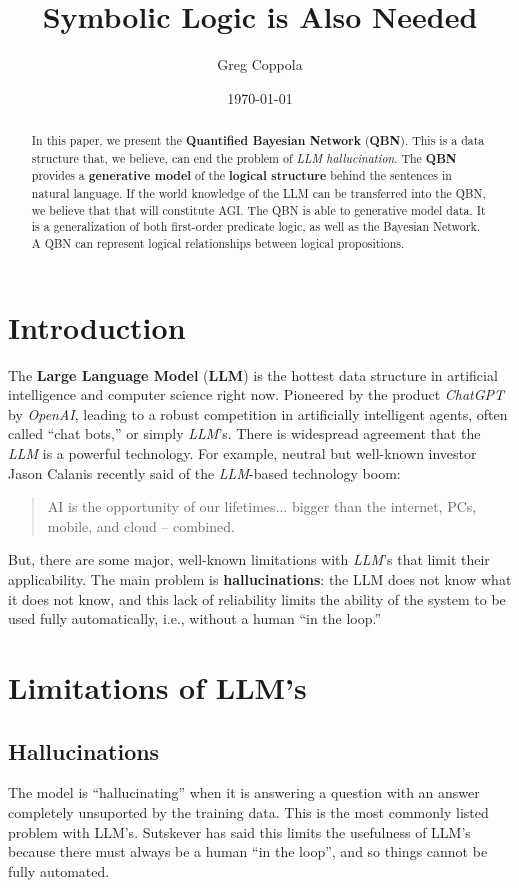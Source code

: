 \documentclass[12pt]{article}
\title{Symbolic Logic is Also Needed}
\author{Greg Coppola}
\date{\today}
\begin{document}
\maketitle


\begin{abstract}
In this paper, we present the {\bf Quantified Bayesian Network} ({\bf QBN}).
This is a data structure that, we believe, can end the problem of {\em LLM hallucination}.
The {\bf QBN} provides a {\bf generative model} of the {\bf logical structure} behind the sentences in natural language.
If the world knowledge of the LLM can be transferred into the QBN, we believe that that will constitute AGI.
The QBN is able to generative model data.
It is a generalization of both first-order predicate logic, as well as the Bayesian Network.
A QBN can represent logical relationships between logical propositions.
\end{abstract}
\section{Introduction}
The {\bf Large Language Model} ({\bf LLM}) is the hottest data structure in artificial intelligence and computer science right now.
Pioneered by the product {\em ChatGPT} by {\em OpenAI},
leading to a robust competition in artificially intelligent agents, often called ``chat bots,'' or simply {\em LLM}'s.
There is widespread agreement that the {\em LLM} is a powerful technology.
For example, neutral but well-known investor Jason Calanis recently said of the {\em LLM}-based technology boom:
\begin{quote}
    AI is the opportunity of our lifetimes... 
    bigger than the internet, PCs, mobile, and cloud -- combined.  
    \cite{Jason2023}
\end{quote}
But, there are some major, well-known limitations with {\em LLM}'s that limit their applicability.
The main problem is {\bf hallucinations}: the LLM does not know what it does not know, and this lack of reliability limits the ability of the system to be used fully automatically, i.e., without a human ``in the loop.''
\section{Limitations of LLM's}
\subsection{Hallucinations}
The model is ``hallucinating'' when it is answering a question with an answer completely unsuported by the training data.
This is the most commonly listed problem with LLM's.
Sutskever \cite{sutskever:huang:2023} has said this limits the usefulness of LLM's because there must always be a human ``in the loop'', and so things cannot be fully automated.
\end{document}
